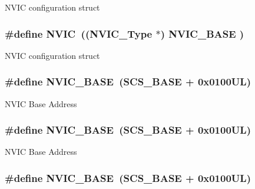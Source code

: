 N\-V\-I\-C configuration struct \hypertarget{group___c_m_s_i_s__core__register_gac8e97e8ce56ae9f57da1363a937f8a17}{
\subsubsection[{N\-V\-I\-C}]{\setlength{\rightskip}{0pt plus 5cm}\#define N\-V\-I\-C~(({\bf N\-V\-I\-C\-\_\-\-Type}      $\ast$)     {\bf N\-V\-I\-C\-\_\-\-B\-A\-S\-E}     )}}\label{group___c_m_s_i_s__core__register_gac8e97e8ce56ae9f57da1363a937f8a17}
N\-V\-I\-C configuration struct \hypertarget{group___c_m_s_i_s__core__register_gaa0288691785a5f868238e0468b39523d}{
\subsubsection[{N\-V\-I\-C\-\_\-\-B\-A\-S\-E}]{\setlength{\rightskip}{0pt plus 5cm}\#define N\-V\-I\-C\-\_\-\-B\-A\-S\-E~({\bf S\-C\-S\-\_\-\-B\-A\-S\-E} +  0x0100\-U\-L)}}\label{group___c_m_s_i_s__core__register_gaa0288691785a5f868238e0468b39523d}
N\-V\-I\-C Base Address \hypertarget{group___c_m_s_i_s__core__register_gaa0288691785a5f868238e0468b39523d}{
\subsubsection[{N\-V\-I\-C\-\_\-\-B\-A\-S\-E}]{\setlength{\rightskip}{0pt plus 5cm}\#define N\-V\-I\-C\-\_\-\-B\-A\-S\-E~({\bf S\-C\-S\-\_\-\-B\-A\-S\-E} +  0x0100\-U\-L)}}\label{group___c_m_s_i_s__core__register_gaa0288691785a5f868238e0468b39523d}
N\-V\-I\-C Base Address \hypertarget{group___c_m_s_i_s__core__register_gaa0288691785a5f868238e0468b39523d}{
\subsubsection[{N\-V\-I\-C\-\_\-\-B\-A\-S\-E}]{\setlength{\rightskip}{0pt plus 5cm}\#define N\-V\-I\-C\-\_\-\-B\-A\-S\-E~({\bf S\-C\-S\-\_\-\-B\-A\-S\-E} +  0x0100\-U\-L)}}\label{group___c_m_s_i_s__core__register_gaa0288691785a5f868238e0468b39523d}
